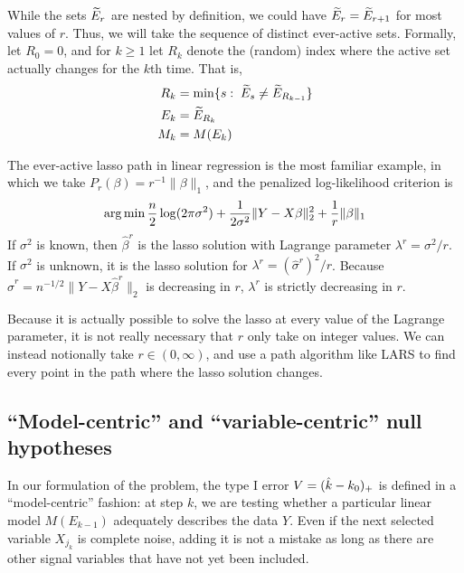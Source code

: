 \documentclass{article}
\begin{document}
While the sets $\widetilde{E}_r$ are nested by definition, we could have $\widetilde{E}_r = \widetilde{E}_{r+1}$ for most values of $r$. Thus, we will take the sequence of distinct ever-active sets. Formally, let $R_0=0$, and for $k\geq 1$ let $R_k$ denote the (random) index where the active set actually changes for the $k$th time. That is,
\begin{align}
  R_k &= \min\{s:\; \widetilde{E}_s \neq \widetilde{E}_{R_{k-1}}\}\\
  E_k &= \widetilde{E}_{R_k}\\
  \label{eq:regPathDef_end}
  M_k &= M(E_k)
\end{align}

The ever-active lasso path in linear regression is the most familiar example, in which we take $P_r(\beta) = r^{-1}\|\beta\|_1$, and the penalized log-likelihood criterion is
\begin{equation}
  \operatorname*{arg\,min} \frac{n}{2}\log(2\pi\sigma^2) 
  + \frac{1}{2\sigma^2}\|Y - X\beta\|_2^2 + \frac{1}{r}\|\beta\|_1
\end{equation}
If $\sigma^2$ is known, then $\hat\beta^{r}$ is the lasso solution with Lagrange parameter $\lambda^r = \sigma^{2}/r$. If $\sigma^2$ is unknown, it is the lasso solution for $\lambda^r = (\hat\sigma^r)^2/r$. Because $\hat\sigma^r = n^{-1/2}\|Y-X\hat\beta^r\|_2$ is decreasing in $r$, $\lambda^r$ is strictly decreasing in $r$.

Because it is actually possible to solve the lasso at every value of the Lagrange parameter, it is not really necessary that $r$ only take on integer values. We can instead notionally take $r\in (0,\infty)$, and use a path algorithm like LARS \citep{taylor2014exact} to find every point in the path where the lasso solution changes.

\subsection{``Model-centric'' and ``variable-centric'' null hypotheses}
\label{sec:whichnull}


In our formulation of the problem, the type I error $V=(\hat{k}-k_0)_+$ is defined in a ``model-centric'' fashion: at step $k$, we are testing  whether a particular linear model $M(E_{k-1})$ adequately describes the data $Y$. Even if the next selected variable $X_{j_k}$ is complete noise, adding it is not a mistake as long as there are other signal variables that have not yet been included. 
\end{document}
